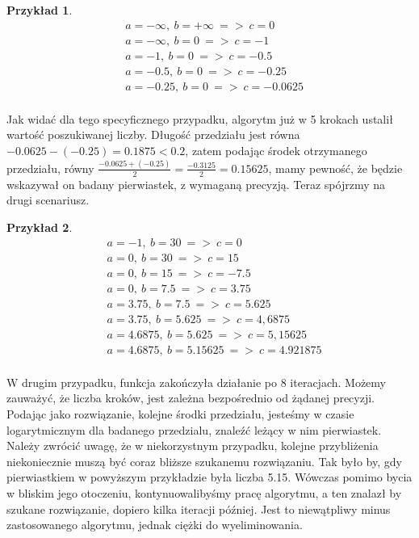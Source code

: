 \documentclass[twoside,a4paper]{book}
\newtheorem{example}{Przykład}
\begin{document}
\begin{example}
	\begin{equation}
		\begin{split}
			&a = -\infty,\ b = +\infty\ =>\ c=0 \\
			&a = -\infty,\ b = 0\ =>\ c=-1 \\
			&a = -1,\ b = 0\ =>\ c=-0.5 \\
			&a = -0.5,\ b = 0\ =>\ c=-0.25 \\
			&a = -0.25,\ b = 0\ =>\ c=-0.0625 \\
		\end{split}
	\end{equation}
\end{example}

Jak widać dla tego specyficznego przypadku, algorytm już w 5 krokach ustalił wartość poszukiwanej liczby. Długość przedziału jest równa $-0.0625-(-0.25)=0.1875<0.2$, zatem podając środek otrzymanego przedziału, równy $\frac{-0.0625+(-0.25)}{2}=\frac{-0.3125}{2}=0.15625$, mamy pewność, że będzie wskazywał on badany pierwiastek, z wymaganą precyzją. Teraz spójrzmy na drugi scenariusz.

\begin{example}
	\begin{equation}
	\begin{split}
	&a = -1,\ b = 30\ =>\ c=0 \\
	&a = 0,\ b = 30\ =>\ c=15 \\
	&a = 0,\ b = 15\ =>\ c=-7.5 \\
	&a = 0,\ b = 7.5\ =>\ c=3.75 \\
	&a = 3.75,\ b = 7.5\ =>\ c=5.625 \\
	&a = 3.75,\ b = 5.625\ =>\ c=4,6875 \\
	&a = 4.6875,\ b = 5.625\ =>\ c=5,15625 \\
	&a = 4.6875,\ b = 5.15625\ =>\ c=4.921875 \\
	\end{split}
	\end{equation}
\end{example}

W drugim przypadku, funkcja zakończyła działanie po 8 iteracjach. Możemy zauważyć, że liczba kroków, jest zależna bezpośrednio od żądanej precyzji. Podając jako rozwiązanie, kolejne środki przedziału, jesteśmy w czasie logarytmicznym dla badanego przedzialu, znaleźć leżący w nim pierwiastek. Należy zwrócić uwagę, że w niekorzystnym przypadku, kolejne przybliżenia niekoniecznie muszą być coraz bliższe szukanemu rozwiązaniu. Tak było by, gdy pierwiastkiem w powyższym przykładzie była liczba 5.15. Wówczas pomimo bycia w bliskim jego otoczeniu, kontynuowalibyśmy pracę algorytmu, a ten znalazł by szukane rozwiązanie, dopiero kilka iteracji później. Jest to niewątpliwy minus zastosowanego algorytmu, jednak ciężki do wyeliminowania.
\end{document}
